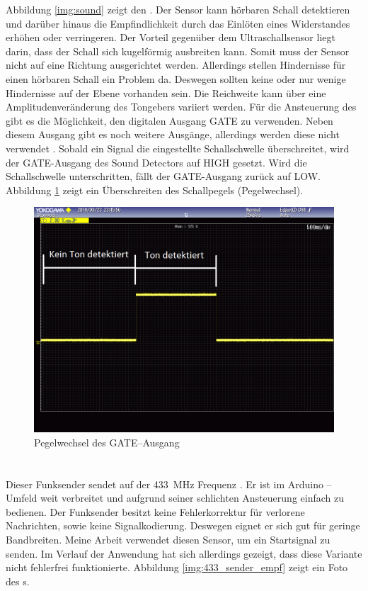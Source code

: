 Abbildung \ref{img:sound} zeigt den \microphone. Der Sensor kann hörbaren Schall detektieren und darüber hinaus die Empfindlichkeit durch das Einlöten eines Widerstandes erhöhen oder verringeren. Der Vorteil gegenüber dem Ultraschallsensor liegt darin, dass der Schall sich kugelförmig ausbreiten kann. Somit muss der Sensor nicht auf eine Richtung ausgerichtet werden. Allerdings stellen Hindernisse für einen hörbaren Schall ein Problem da. Deswegen sollten keine oder nur wenige Hindernisse auf der Ebene vorhanden sein. Die Reichweite kann über eine Amplitudenveränderung des Tongebers variiert werden. Für die Ansteuerung des \microphone \platz gibt es die Möglichkeit, den digitalen Ausgang \si{GATE} zu verwenden. Neben diesem Ausgang gibt es noch weitere Ausgänge, allerdings werden diese nicht verwendet \cite{src_SOUND_DETECTOR}. Sobald ein Signal die eingestellte Schallschwelle überschreitet, wird der \si{GATE}-Ausgang des Sound Detectors auf \si{HIGH} gesetzt. Wird die Schallschwelle unterschritten, fällt der \si{GATE}-Ausgang zurück auf \si{LOW}. Abbildung \ref{img:gate_ausgang} zeigt ein Überschreiten des Schallpegels (Pegelwechsel).
 
\begin{figure}[H]
        \centering
        \includegraphics[width=1\textwidth]{images/gate_ausgang.png}
        \caption{Pegelwechsel des \si{GATE}--Ausgang}
        \label{img:gate_ausgang}
\end{figure}

\paragraph{\funkempfaenger}\mbox{}\\
Dieser Funksender sendet auf der \SI{433}{\mega \hertz} Frequenz \cite{src_433_FUNKSENDER}. Er ist im Arduino -- Umfeld weit verbreitet und aufgrund seiner schlichten Ansteuerung einfach zu bedienen. Der Funksender besitzt keine Fehlerkorrektur für verlorene Nachrichten, sowie keine Signalkodierung. Deswegen eignet er sich gut für geringe Bandbreiten. Meine Arbeit verwendet diesen Sensor, um ein Startsignal zu senden. Im Verlauf der Anwendung hat sich allerdings gezeigt, dass diese Variante nicht fehlerfrei funktionierte. Abbildung \ref{img:433_sender_empf} zeigt ein Foto des \funkempfaenger s.

